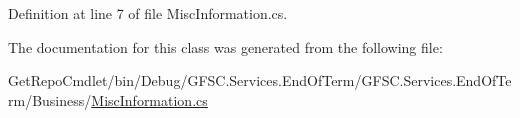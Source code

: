 Definition at line 7 of file Misc\+Information.\+cs.



The documentation for this class was generated from the following file\+:\begin{DoxyCompactItemize}
\item 
Get\+Repo\+Cmdlet/bin/\+Debug/\+G\+F\+S\+C.\+Services.\+End\+Of\+Term/\+G\+F\+S\+C.\+Services.\+End\+Of\+Term/\+Business/\mbox{\hyperlink{_business_2_misc_information_8cs}{Misc\+Information.\+cs}}\end{DoxyCompactItemize}
